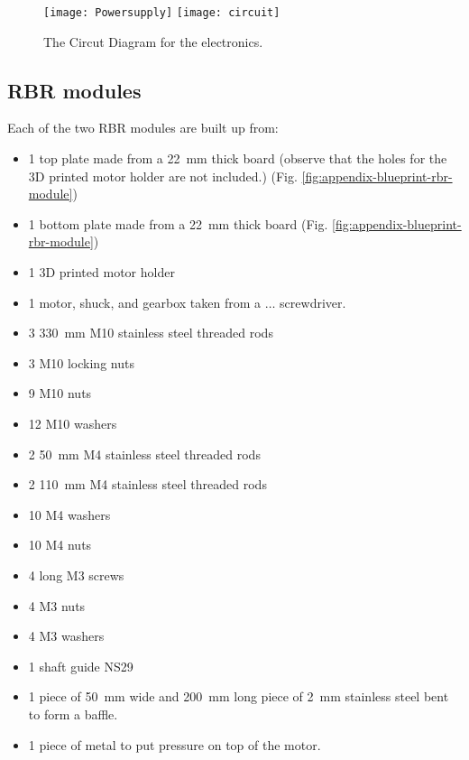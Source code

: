 \begin{figure}[htbp]
  \centering
  \texttt{[image: Powersupply]}
  \texttt{[image: circuit]}
  
  \caption{The Circut Diagram for the electronics.}
  \label{fig:appendix-circuit-diagrams}
    
\end{figure}

\subsection{RBR modules}

Each of the two RBR modules are built up from:

\begin{itemize}
  \item 1 top plate made from a 22~mm thick board (observe that the holes for
    the 3D printed motor holder are not included.) (Fig. \ref{fig:appendix-blueprint-rbr-module})
  \item 1 bottom plate made from a 22~mm thick board (Fig. \ref{fig:appendix-blueprint-rbr-module})
  \item 1 3D printed motor holder
  \item 1 motor, shuck, and gearbox taken from a $\dots$
    screwdriver.
  \item 3 330~mm M10 stainless steel threaded rods
  \item 3 M10 locking nuts
  \item 9 M10 nuts
  \item 12 M10 washers
  \item 2 50~mm M4 stainless steel threaded rods
  \item 2 110~mm M4 stainless steel threaded rods
  \item 10 M4 washers
  \item 10 M4 nuts
  \item 4 long M3 screws
  \item 4 M3 nuts
  \item 4 M3 washers
  \item 1 shaft guide NS29
  \item 1 piece of 50~mm wide and 200~mm long piece of 2~mm stainless steel
    bent to form a baffle.
  \item 1 piece of metal to put pressure on top of the motor.
\end{itemize}


